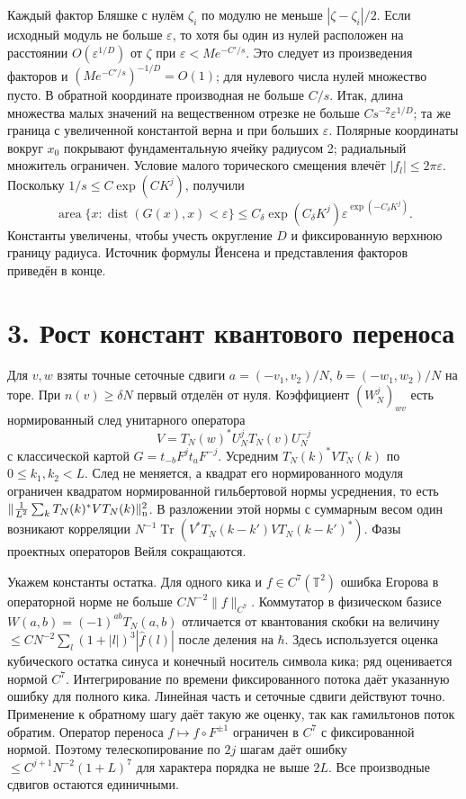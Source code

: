 \documentclass[11pt,a4paper]{article}
\newcommand{\Tr}{\operatorname{Tr}}
\newcommand{\sect}[1]{\section*{\sffamily\color{ink}#1}}
\newcommand{\T}{\mathbb T}
\begin{document}
Каждый фактор Бляшке с нулём $\zeta_i$ по модулю не меньше $|\zeta-\zeta_i|/2$. Если исходный модуль не больше $\varepsilon$, то хотя бы один из нулей расположен на расстоянии $O(\varepsilon^{1/D})$ от $\zeta$ при $\varepsilon<M e^{-C'/s}$. Это следует из произведения факторов и $(M e^{-C'/s})^{-1/D}=O(1)$; для нулевого числа нулей множество пусто. В обратной координате производная не больше $C/s$. Итак, длина множества малых значений на вещественном отрезке не больше $C s^{-2}\varepsilon^{1/D}$; та же граница с увеличенной константой верна и при больших $\varepsilon$. Полярные координаты вокруг $x_0$ покрывают фундаментальную ячейку радиусом 2; радиальный множитель ограничен. Условие малого торического смещения влечёт $|f_l|\le 2\pi\varepsilon$. Поскольку $1/s\le C\exp(C K^j)$, получили
\[
 \operatorname{area}\{x:\operatorname{dist}(G(x),x)<\varepsilon\}
      \le C_\delta \exp(C_\delta K^j)
                   \varepsilon^{\exp(-C_\delta K^j)}.              \tag{5}
\]
Константы увеличены, чтобы учесть округление $D$ и фиксированную верхнюю границу радиуса. Источник формулы Йенсена и представления факторов приведён в конце.
\newpage
\sect{3. Рост констант квантового переноса}
Для $v,w$ взяты точные сеточные сдвиги $a=(-v_1,v_2)/N$, $b=(-w_1,w_2)/N$ на торе. При $n(v)\ge\delta N$ первый отделён от нуля. Коэффициент $(W_N^j)_{wv}$ есть нормированный след унитарного оператора
\[
                    V=T_N(w)^*U_N^j T_N(v)U_N^{-j}
\]
с классической картой $G=t_{-b}F^jt_a F^{-j}$. Усредним $T_N(k)^* V T_N(k)$ по $0\le k_1,k_2<L$. След не меняется, а квадрат его нормированного модуля ограничен квадратом нормированной гильбертовой нормы усреднения, то есть $\|\frac1{L^2}\sum_k T_N(k)^* V T_N(k)\|_{\rm n}^2$. В разложении этой нормы с суммарным весом один возникают корреляции $N^{-1}\Tr(V^* T_N(k-k') V T_N(k-k')^*)$. Фазы проектных операторов Вейля сокращаются.

Укажем константы остатка. Для одного кика и $f\in C^7(\T^2)$ ошибка Егорова в операторной норме не больше $C N^{-2}\|f\|_{C^7}$. Коммутатор в физическом базисе $W(a,b)=(-1)^{ab}T_N(a,b)$ отличается от квантования скобки на величину $\le C N^{-2}\sum_l(1+|l|)^3|\widehat f(l)|$ после деления на $\hbar$. Здесь используется оценка кубического остатка синуса и конечный носитель символа кика; ряд оценивается нормой $C^7$. Интегрирование по времени фиксированного потока даёт указанную ошибку для полного кика. Линейная часть и сеточные сдвиги действуют точно. Применение к обратному шагу даёт такую же оценку, так как гамильтонов поток обратим. Оператор переноса $f\mapsto f\circ F^{\pm1}$ ограничен в $C^7$ с фиксированной нормой. Поэтому телескопирование по $2j$ шагам даёт ошибку $\le C^{j+1} N^{-2}(1+L)^7$ для характера порядка не выше $2L$. Все производные сдвигов остаются единичными.
\end{document}
